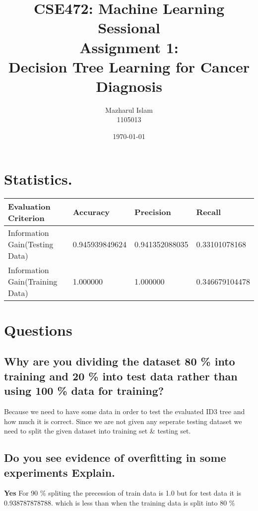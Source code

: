 \documentclass[11pt]{article}
\title{\textbf{CSE472: Machine Learning Sessional}\\Assignment 1:\\ Decision Tree Learning for Cancer
Diagnosis
}
\author{Mazharul Islam\\
		1105013
		}
\date{\today}
\begin{document}
\maketitle

\section{Statistics.}\begin{tabular}{|l|l|l|l|}
	\hline
		Evaluation Criterion &  Accuracy& Precision& Recall\\
	\hline
		Information Gain(Testing Data) &  0.945939849624 &  0.941352088035 & 0.33101078168 \\
	\hline
	\hline
		Information Gain(Training Data) &  1.000000 &  1.000000 & 0.346679104478 \\
	\hline
	\end{tabular}

\section{Questions}
	\subsection{Why are you dividing the dataset 80 \% into training and 20 \% into test data rather than using 100 \% data for training?}
		
	Because we need to have some data in order to test  the evaluated ID3 tree and  how much it is correct. Since we are not given any seperate testing dataset we need to split the given dataset into training set \& testing set.	
	\subsection{Do you see evidence of overfitting in  some  experiments  Explain.}
	\textbf{Yes} For 90 \% spliting the precession of train data is 1.0
but for test data it is  0.938787878788. which is less than when the training data is split into 80 \%
\end{document}
